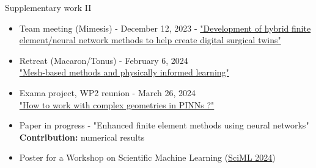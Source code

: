\begin{frame}{Supplementary work II}
	\small
	\vspace{-5pt}
	
	\begin{tcolorbox}[
		skin=bicolor,
		colback=other, %
		colbacklower=other!20!white,
		title={Talks},
		arc=2mm, %
		boxrule=0.5pt, %
		breakable, enhanced jigsaw,
		width=\linewidth,
		opacityback=0.1
		]
		
		\begin{itemize}[\textcolor{other}{$\blacktriangleright$}]
			\item Team meeting (Mimesis) - December 12, 2023 - \href{https://flecourtier.github.io/these2023/these2023/1.0.3/_attachments/presentation/2023_12_12.pdf}{"Development of hybrid finite element/neural network methods to help create digital surgical twins"}
			\item Retreat (Macaron/Tonus) - February 6, 2024 \\
			\href{https://flecourtier.github.io/these2023/these2023/1.0.3/_attachments/presentation/2024_02_06.pdf}{"Mesh-based methods and physically informed learning"}
			\item Exama project, WP2 reunion - March 26, 2024 \\
			\href{https://flecourtier.github.io/these2023/these2023/1.0.3/_attachments/presentation/2024_03_26.pdf}{"How to work with complex geometries in PINNs ?"}
		\end{itemize}
	\end{tcolorbox}

	\begin{tcolorbox}[
		skin=bicolor,
		colback=other, %
		colbacklower=other!20!white,
		title={Coming soon...},
		arc=2mm, %
		boxrule=0.5pt, %
		breakable, enhanced jigsaw,
		width=\linewidth,
		opacityback=0.1
		]
		
		\begin{itemize}[\textcolor{other}{$\blacktriangleright$}]
			\item Paper in progress - "Enhanced finite element methods using neural networks" \\
			\textbf{Contribution:} numerical results
			\item Poster for a Workshop on Scientific Machine Learning (\href{https://irma.math.unistra.fr/~micheldansac/SciML2024/participants.html}{SciML 2024})
		\end{itemize}
	\end{tcolorbox}
\end{frame}

